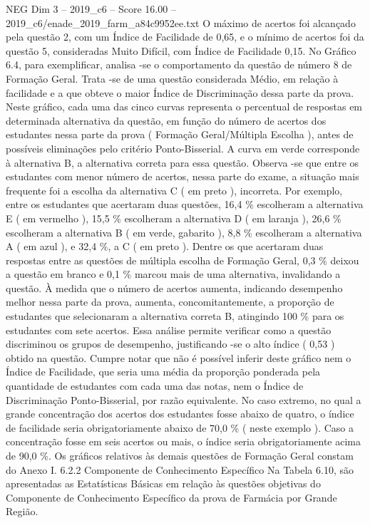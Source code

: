\begin{textsample}{NEG Dim 3 – 2019\_c6 – Score 16.00 – 2019\_c6/enade\_2019\_farm\_a84c9952ee.txt}
O máximo de acertos foi alcançado pela questão 2, com um Índice de Facilidade de 0,65, e o mínimo de acertos foi da questão 5, consideradas Muito Difícil, com Índice de Facilidade 0,15.
No Gráfico 6.4, para exemplificar, analisa -se o comportamento da questão de número 8 de Formação Geral.
Trata -se de uma questão considerada Médio, em relação à facilidade e a que obteve o maior Índice de Discriminação dessa parte da prova.
Neste gráfico, cada uma das cinco curvas representa o percentual de respostas em determinada alternativa da questão, em função do número de acertos dos estudantes nessa parte da prova ( Formação Geral/Múltipla Escolha ), antes de possíveis eliminações pelo critério Ponto-Bisserial.
A curva em verde corresponde à alternativa B, a alternativa correta para essa questão.
Observa -se que entre os estudantes com menor número de acertos, nessa parte do exame, a situação mais frequente foi a escolha da alternativa C ( em preto ), incorreta.
Por exemplo, entre os estudantes que acertaram duas questões, 16,4 \% escolheram a alternativa E ( em vermelho ), 15,5 \% escolheram a alternativa D ( em laranja ), 26,6 \% escolheram a alternativa B ( em verde, gabarito ), 8,8 \% escolheram a alternativa A ( em azul ), e 32,4 \%, a C ( em preto ).
Dentre os que acertaram duas respostas entre as questões de múltipla escolha de Formação Geral, 0,3 \% deixou a questão em branco e 0,1 \% marcou mais de uma alternativa, invalidando a questão.
À medida que o número de acertos aumenta, indicando desempenho melhor nessa parte da prova, aumenta, concomitantemente, a proporção de estudantes que selecionaram a alternativa correta B, atingindo 100 \% para os estudantes com sete acertos.
Essa análise permite verificar como a questão discriminou os grupos de desempenho, justificando -se o alto índice ( 0,53 ) obtido na questão.
Cumpre notar que não é possível inferir deste gráfico nem o Índice de Facilidade, que seria uma média da proporção ponderada pela quantidade de estudantes com cada uma das notas, nem o Índice de Discriminação Ponto-Bisserial, por razão equivalente.
No caso extremo, no qual a grande concentração dos acertos dos estudantes fosse abaixo de quatro, o índice de facilidade seria obrigatoriamente abaixo de 70,0 \% ( neste exemplo ).
Caso a concentração fosse em seis acertos ou mais, o índice seria obrigatoriamente acima de 90,0 \%.
Os gráficos relativos às demais questões de Formação Geral constam do Anexo I. 6.2.2 Componente de Conhecimento Específico Na Tabela 6.10, são apresentadas as Estatísticas Básicas em relação às questões objetivas do Componente de Conhecimento Específico da prova de Farmácia por Grande Região.

\end{textsample}

